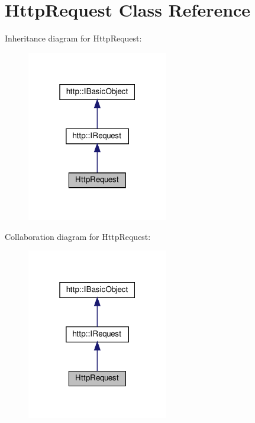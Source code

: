\hypertarget{classHttpRequest}{}\section{Http\+Request Class Reference}
\label{classHttpRequest}


Inheritance diagram for Http\+Request\+:
\nopagebreak
\begin{figure}[H]
\begin{center}
\leavevmode
\includegraphics[width=175pt]{classHttpRequest__inherit__graph}
\end{center}
\end{figure}


Collaboration diagram for Http\+Request\+:
\nopagebreak
\begin{figure}[H]
\begin{center}
\leavevmode
\includegraphics[width=175pt]{classHttpRequest__coll__graph}
\end{center}
\end{figure}
